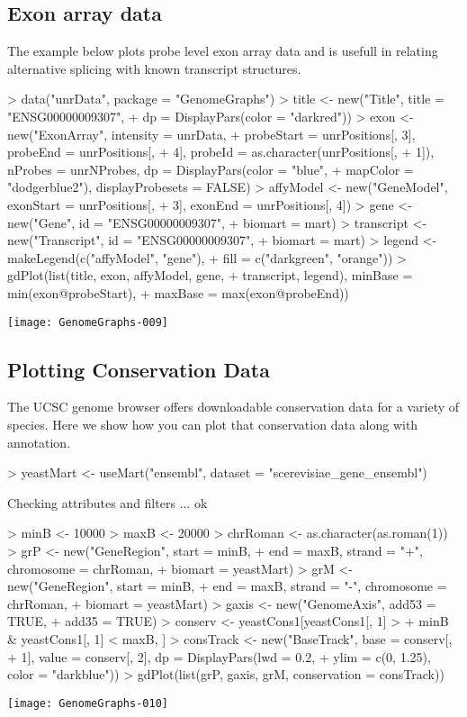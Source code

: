 \documentclass[11pt]{article}
\begin{document}
\subsection{Exon array data}

The example below plots probe level exon array data and is usefull in
relating alternative splicing with known transcript structures.

\begin{Schunk}
\begin{Sinput}
> data("unrData", package = "GenomeGraphs")
> title <- new("Title", title = "ENSG00000009307", 
+     dp = DisplayPars(color = "darkred"))
> exon <- new("ExonArray", intensity = unrData, 
+     probeStart = unrPositions[, 3], probeEnd = unrPositions[, 
+         4], probeId = as.character(unrPositions[, 
+         1]), nProbes = unrNProbes, dp = DisplayPars(color = "blue", 
+         mapColor = "dodgerblue2"), displayProbesets = FALSE)
> affyModel <- new("GeneModel", exonStart = unrPositions[, 
+     3], exonEnd = unrPositions[, 4])
> gene <- new("Gene", id = "ENSG00000009307", 
+     biomart = mart)
> transcript <- new("Transcript", id = "ENSG00000009307", 
+     biomart = mart)
> legend <- makeLegend(c("affyModel", "gene"), 
+     fill = c("darkgreen", "orange"))
> gdPlot(list(title, exon, affyModel, gene, 
+     transcript, legend), minBase = min(exon@probeStart), 
+     maxBase = max(exon@probeEnd))
\end{Sinput}
\end{Schunk}
\texttt{[image: GenomeGraphs-009]}

\subsection{Plotting Conservation Data}
The UCSC genome browser offers downloadable conservation data for a
variety of species. Here we show how you can plot that conservation
data along with annotation. 

\begin{Schunk}
\begin{Sinput}
> yeastMart <- useMart("ensembl", dataset = "scerevisiae_gene_ensembl")
\end{Sinput}
\begin{Soutput}
Checking attributes and filters ... ok
\end{Soutput}
\begin{Sinput}
> minB <- 10000
> maxB <- 20000
> chrRoman <- as.character(as.roman(1))
> grP <- new("GeneRegion", start = minB, 
+     end = maxB, strand = "+", chromosome = chrRoman, 
+     biomart = yeastMart)
> grM <- new("GeneRegion", start = minB, 
+     end = maxB, strand = "-", chromosome = chrRoman, 
+     biomart = yeastMart)
> gaxis <- new("GenomeAxis", add53 = TRUE, 
+     add35 = TRUE)
> conserv <- yeastCons1[yeastCons1[, 1] > 
+     minB & yeastCons1[, 1] < maxB, ]
> consTrack <- new("BaseTrack", base = conserv[, 
+     1], value = conserv[, 2], dp = DisplayPars(lwd = 0.2, 
+     ylim = c(0, 1.25), color = "darkblue"))
> gdPlot(list(grP, gaxis, grM, conservation = consTrack))
\end{Sinput}
\end{Schunk}
\texttt{[image: GenomeGraphs-010]}
\end{document}
